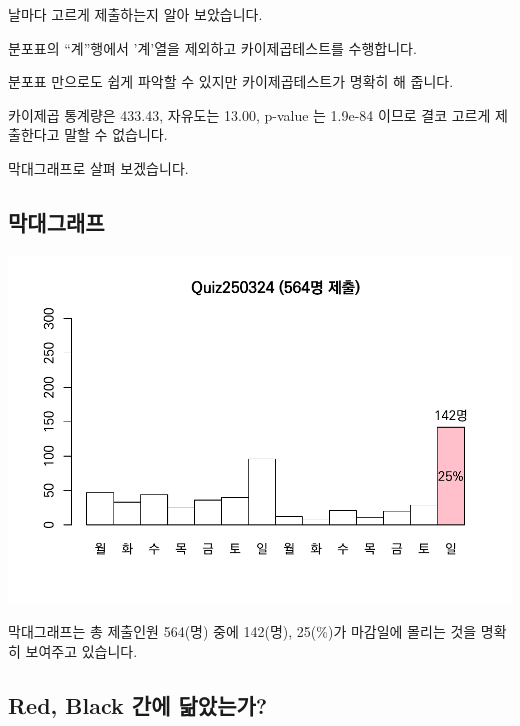 \documentclass[
]{book}
\begin{document}
날마다 고르게 제출하는지 알아 보았습니다.

분포표의 ``계''행에서 '계'열을 제외하고 카이제곱테스트를 수행합니다.

분포표 만으로도 쉽게 파악할 수 있지만 카이제곱테스트가 명확히 해 줍니다.

카이제곱 통계량은 433.43, 자유도는 13.00, p-value 는 1.9e-84 이므로 결코 고르게 제출한다고 말할 수 없습니다.

막대그래프로 살펴 보겠습니다.

\subsection{막대그래프}\label{uxb9c9uxb300uxadf8uxb798uxd504-3}

\includegraphics{Quiz_report_2025_files/figure-latex/unnamed-chunk-86-1.pdf}

막대그래프는 총 제출인원 564(명) 중에 142(명), 25(\%)가 마감일에 몰리는 것을 명확히 보여주고 있습니다.

\subsection{Red, Black 간에 닮았는가?}\label{red-black-uxac04uxc5d0-uxb2eeuxc558uxb294uxac00-3}
\end{document}
